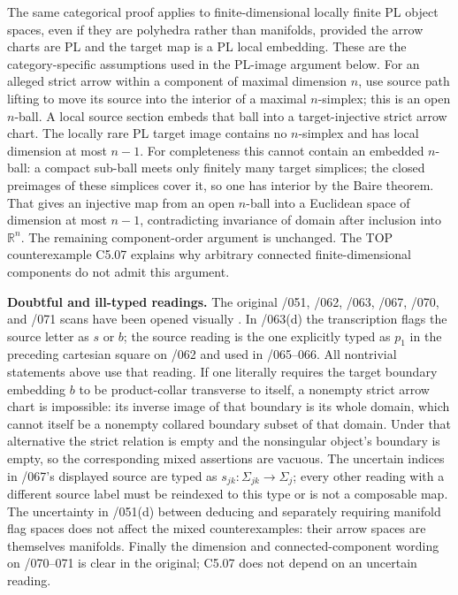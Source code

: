 The same categorical proof applies to finite-dimensional locally finite PL object spaces, even if they are polyhedra rather than manifolds, provided the arrow charts are PL and the target map is a PL local embedding. These are the category-specific assumptions used in the PL-image argument below. For an alleged strict arrow within a component of maximal dimension \(n\), use source path lifting to move its source into the interior of a maximal \(n\)-simplex; this is an open \(n\)-ball. A local source section embeds that ball into a target-injective strict arrow chart. The locally rare PL target image contains no \(n\)-simplex and has local dimension at most \(n-1\). For completeness this cannot contain an embedded \(n\)-ball: a compact sub-ball meets only finitely many target simplices; the closed preimages of these simplices cover it, so one has interior by the Baire theorem. That gives an injective map from an open \(n\)-ball into a Euclidean space of dimension at most \(n-1\), contradicting invariance of domain after inclusion into \(\mathbb R^n\). The remaining component-order argument is unchanged. The TOP counterexample C5.07 explains why arbitrary connected finite-dimensional components do not admit this argument.

\textbf{Doubtful and ill-typed readings.} The original /051, /062, /063, /067, /070, and /071 scans have been opened visually \cite{C_Grothendieck150}. In /063(d) the transcription flags the source letter as \(s\) or \(b\); the source reading is the one explicitly typed as \(p_1\) in the preceding cartesian square on /062 and used in /065--066. All nontrivial statements above use that reading. If one literally requires the target boundary embedding \(b\) to be product-collar transverse to itself, a nonempty strict arrow chart is impossible: its inverse image of that boundary is its whole domain, which cannot itself be a nonempty collared boundary subset of that domain. Under that alternative the strict relation is empty and the nonsingular object's boundary is empty, so the corresponding mixed assertions are vacuous. The uncertain indices in /067's displayed source are typed as \(s_{jk}:\Sigma_{jk}\to\Sigma_j\); every other reading with a different source label must be reindexed to this type or is not a composable map. The uncertainty in /051(d) between deducing and separately requiring manifold flag spaces does not affect the mixed counterexamples: their arrow spaces are themselves manifolds. Finally the dimension and connected-component wording on /070--071 is clear in the original; C5.07 does not depend on an uncertain reading.

